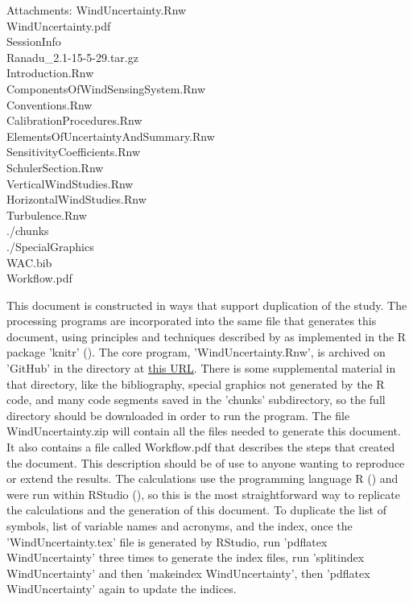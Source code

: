 \documentclass[12pt,twoside,english]{article}\usepackage[]{graphicx}\usepackage[]{color}
\let\OrgIndex\index
\renewcommand*{\index}[1]{\OrgIndex{#1}}
\newenvironment{lyxlist}[1]
{\begin{list}{}
{\settowidth{\labelwidth}{#1}
\setlength{\leftmargin}{\labelwidth}
\addtolength{\leftmargin}{\labelsep}
\renewcommand{\makelabel}[1]{##1\hfil}}}
{\end{list}}
\newcommand{\attachm}[1]{\begin{lyxlist}{Attachments:00}
\item [Attachments:] {#1}
\end{lyxlist}}
\begin{document}
{{\begin{appendices}
\attachm{WindUncertainty.Rnw\\WindUncertainty.pdf\\SessionInfo\\Ranadu\_2.1-15-5-29.tar.gz\\Introduction.Rnw\\ComponentsOfWindSensingSystem.Rnw\\Conventions.Rnw\\CalibrationProcedures.Rnw\\ElementsOfUncertaintyAndSummary.Rnw\\SensitivityCoefficients.Rnw\\SchulerSection.Rnw\\VerticalWindStudies.Rnw\\HorizontalWindStudies.Rnw\\Turbulence.Rnw\\./chunks\\./SpecialGraphics\\WAC.bib\\Workflow.pdf}

This document is constructed in ways that support duplication of the
study. The processing programs are incorporated into the same file
that generates this document, using principles and techniques described
by \citet{Xie2014a} as implemented in the R package 'knitr' (\citet{Xie2014b}).
The core program, 'WindUncertainty.Rnw', is archived on 'GitHub' 
in
the directory at \href{https://github.com/WilliamCooper/WindUncertainty.git}{this URL}.
There is some supplemental material in that directory, like the bibliography, special graphics not generated by the R code,
and many code segments saved in the 'chunks' subdirectory, so the
full directory should be downloaded in order to run the program. The file WindUncertainty.zip will contain all the files needed to generate this document. It also contains a file called Workflow.pdf that describes the steps that created the document. This description should be of use to anyone wanting to reproduce or extend the results. The calculations
use the programming language R (\citet{Rlanguage}) and were run within RStudio
(\citet{RStudio2012}), so this is the most straightforward way to replicate the
calculations and the generation of this document. To duplicate the list of symbols, list of variable names and acronyms, and the index, once the 'WindUncertainty.tex' file is generated by RStudio, run 'pdflatex WindUncertainty' three times to generate the index files, run 'splitindex WindUncertainty' and then 'makeindex WindUncertainty', then 'pdflatex WindUncertainty' again to update the indices.


\end{appendices}}}
\end{document}
